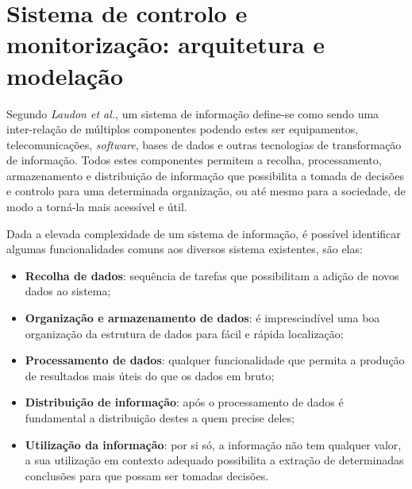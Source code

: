 
\chapter{Sistema de controlo e monitorização: arquitetura e modelação}




Segundo \textit{Laudon et al.}\cite{Laudon1998}, um sistema de informação define-se como sendo uma inter-relação de múltiplos componentes podendo estes ser equipamentos, telecomunicações, \textit{software}, bases de dados e outras tecnologias de transformação de informação. Todos estes componentes permitem a recolha, processamento, armazenamento e distribuição de informação que possibilita a tomada de decisões e controlo para uma determinada organização, ou até mesmo para a sociedade, de modo a torná-la mais acessível e útil.

Dada a elevada complexidade de um sistema de informação, é possível identificar algumas funcionalidades comuns aos diversos sistema existentes, são elas\cite{Turban1996}: 

\begin{itemize}
	\item \textbf{Recolha de dados}: sequência de tarefas que possibilitam a adição de novos dados ao sistema;
	
	\item \textbf{Organização e armazenamento de dados}: é imprescindível uma boa organização da estrutura de dados para fácil e rápida localização;
	
	\item \textbf{Processamento de dados}: qualquer funcionalidade que permita a produção de resultados mais úteis do que os dados em bruto; 
	
	\item \textbf{Distribuição de informação}: após o processamento de dados é fundamental a distribuição destes a quem precise deles; 
	
	\item \textbf{Utilização da informação}: por si só, a informação não tem qualquer valor, a sua utilização em contexto adequado possibilita a extração de determinadas conclusões para que possam ser tomadas decisões.
	
\end{itemize}


